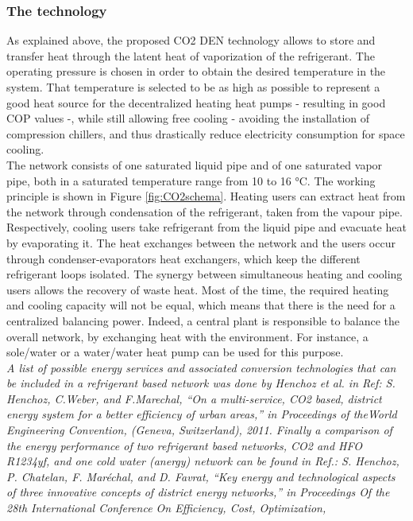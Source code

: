 \documentclass{article}
\begin{document}
\subsubsection{The technology}
As explained above, the proposed CO2 DEN technology allows to store and transfer heat through the latent heat of vaporization of the refrigerant. The operating pressure is chosen in order to obtain the desired temperature in the system. That temperature is selected to be as high as possible to represent a good heat source for the decentralized heating heat pumps - resulting in good COP values -, while still allowing free cooling - avoiding the installation of compression chillers, and thus drastically reduce electricity consumption for space cooling. \\
The network consists of one saturated liquid pipe and of one saturated vapor pipe, both in a saturated temperature range from 10 to 16 \si{\celsius}. 
The working principle is shown in Figure \ref{fig:CO2schema}. Heating users can extract heat from the network through condensation of the refrigerant, taken from the vapour pipe. Respectively, cooling users take refrigerant from the liquid pipe and evacuate heat by evaporating it. The heat exchanges between the network and the users occur through condenser-evaporators heat exchangers, which keep the different refrigerant loops isolated\cite{henchozPotentialRefrigerantBased}. The synergy between simultaneous heating and cooling users allows the recovery of waste heat. Most of the time, the required heating and cooling capacity will not be equal, which means that there is the need for a centralized balancing power. Indeed, a central plant is responsible to balance the overall network, by exchanging heat with the environment. For instance, a sole/water or a water/water heat pump can be used for this purpose.\\

\textit{A list of possible energy services and
associated conversion technologies that can be included in a refrigerant based network was
done by Henchoz et al. in Ref:
S. Henchoz, C.Weber, and F.Marechal, “On a multi-service, CO2 based, district energy
system for a better efficiency of urban areas,” in Proceedings of theWorld Engineering
Convention, (Geneva, Switzerland), 2011.
Finally a comparison of the energy performance of two refrigerant based networks, CO2 and HFO R1234yf, and one cold water
(anergy) network can be found in Ref.:
S. Henchoz, P. Chatelan, F. Maréchal, and D. Favrat, “Key energy and technological
aspects of three innovative concepts of district energy networks,” in Proceedings Of
the 28th International Conference On Efficiency, Cost, Optimization,}
\end{document}
